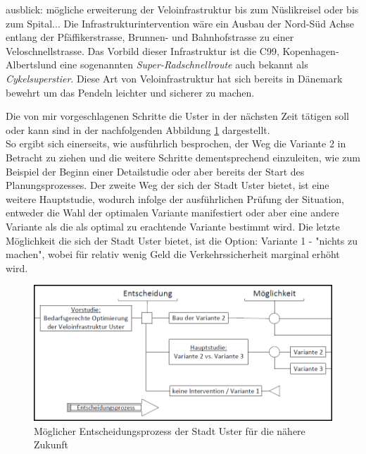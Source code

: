 
ausblick: mögliche erweiterung der Veloinfrastruktur bis zum Nüslikreisel oder bis zum Spital... Die Infrastrukturintervention wäre ein Ausbau der Nord-Süd Achse entlang der Pfäffikerstrasse, Brunnen- und Bahnhofstrasse zu einer Veloschnellstrasse. Das Vorbild dieser Infrastruktur ist die C99, Kopenhagen-Albertslund eine sogenannten \textit{Super-Radschnellroute} auch bekannt als \textit{Cykelsuperstier}. Diese Art von Veloinfrastruktur hat sich bereits in Dänemark bewehrt um das Pendeln leichter und sicherer zu machen. 


Die von mir vorgeschlagenen Schritte die Uster in der nächsten Zeit tätigen soll oder kann sind in der nachfolgenden Abbildung \ref{img:UsterFuture} dargestellt. \\
So ergibt sich einerseits, wie ausführlich besprochen, der Weg die Variante 2 in Betracht zu ziehen und die weitere Schritte dementsprechend einzuleiten, wie zum Beispiel der Beginn einer Detailstudie oder aber bereits der Start des Planungsprozesses. Der zweite Weg der sich der Stadt Uster bietet, ist eine weitere Hauptstudie, wodurch infolge der ausführlichen Prüfung der Situation, entweder die Wahl der optimalen Variante manifestiert oder aber eine andere Variante als die als optimal zu erachtende Variante bestimmt wird. Die letzte Möglichkeit die sich der Stadt Uster bietet, ist die Option: Variante 1 - "nichts zu machen", wobei für relativ wenig Geld die Verkehrssicherheit marginal erhöht wird. 

\begin{figure}[h!]
	\centering
	\includegraphics[width=.45\textwidth]{figures/f-07-01-EntscheidungsprozessUster}
	\caption[Entscheidungsprozess der Stadt Uster]{Möglicher Entscheidungsprozess der Stadt Uster für die nähere Zukunft}
	\label{img:UsterFuture}
\end{figure} 

